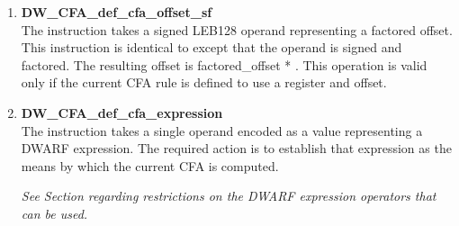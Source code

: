 \begin{enumerate}[1. ]
\item \textbf{DW\-\_CFA\-\_def\-\_cfa\-\_offset\-\_sf} \\
The  instruction takes a signed
LEB128 operand representing a factored offset. This instruction
is identical to  except that the
operand is signed and factored. The resulting offset is
factored\_offset * .
This operation
is valid only if the current CFA rule is defined to use a
register and offset.

\item \textbf{DW\-\_CFA\-\_def\-\_cfa\-\_expression} \\
The  
instruction takes a 
single operand encoded as a 
 value representing a
DWARF expression. The required action is to establish that
expression as the means by which the current CFA is computed.

\textit{See Section  
regarding restrictions on the DWARF
expression operators that can be used.}

\end{enumerate}


